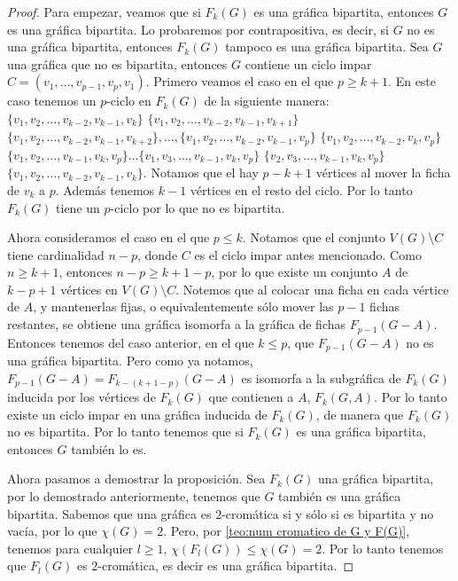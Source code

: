 \begin{proof}
    Para empezar, veamos que si $F_k(G)$ es una gr\'afica bipartita, entonces
    $G$ es una gr\'afica bipartita. Lo probaremos por contrapositiva, es decir,
    si $G$ no es una gr\'afica bipartita, entonces $F_k(G)$ tampoco es una
    gr\'afica bipartita. Sea $G$ una gr\'afica que no es bipartita, entonces $G$
    contiene un ciclo impar $C=(v_1, \dots, v_{p-1}, v_p, v_1)$. Primero veamos
    el caso en el que $p \geq k+1$. En este caso tenemos un $p$-ciclo en
    $F_k(G)$ de la siguiente manera: $\{v_1, v_2, \dots, v_{k-2}, v_{k-1},
    v_k\}$ $\{v_1, v_2, \dots, v_{k-2}, v_{k-1}, v_{k+1}\}$ $\{v_1, v_2, \dots,
    v_{k-2}, v_{k-1}, v_{k+2}\}, \dots, \{v_1, v_2, \dots, v_{k-2}, v_{k-1},
    v_p\}$ $\{v_1, v_2, \dots, v_{k-2}, v_k, v_p\}$ $\{v_1, v_2, \dots, v_{k-1},
    v_k, v_p\} \dots \{v_1, v_3, \dots, v_{k-1}, v_k, v_p\}$ $\{v_2, v_3,
    \dots, v_{k-1}, v_k, v_p\}$ $\{v_1, v_2, \dots, v_{k-2}, v_{k-1}, v_k\}$.
    Notamos que el hay $p-k+1$ v\'ertices al mover la ficha de $v_k$ a $p$.
    Adem\'as tenemos $k-1$ v\'ertices en el resto del ciclo. Por lo tanto
    $F_k(G)$ tiene un $p$-ciclo por lo que no es bipartita.
    
    Ahora consideramos el caso en el que $p \leq k$. Notamos que el conjunto
    $V(G)\setminus C$ tiene cardinalidad $n-p$, donde $C$ es el ciclo impar
    antes mencionado. Como $n \geq k+1$, entonces $n-p \geq k+1-p$, por lo que
    existe un conjunto $A$ de $k-p+1$ v\'ertices en $V(G)\setminus C$. Notemos
    que al colocar una ficha en cada v\'ertice de $A$, y mantenerlas fijas, o
    equivalentemente s\'olo mover las $p-1$ fichas restantes, se obtiene una
    gr\'afica isomorfa a la gr\'afica de fichas $F_{p-1}(G-A)$. Entonces tenemos
    del caso anterior, en el que $k \leq p$, que $F_{p-1}(G-A)$ no es una
    gr\'afica bipartita. Pero como ya notamos, $F_{p-1}(G-A) = F_{k-(k+1-p)}
    (G-A)$ es isomorfa a la subgr\'afica de $F_k(G)$ inducida por los v\'ertices
    de $F_k(G)$ que contienen a $A$, $F_k(G,A)$. Por lo tanto existe un ciclo
    impar en una gr\'afica inducida de $F_k(G)$, de manera que $F_k(G)$ no es
    bipartita. Por lo tanto tenemos que si $F_k(G)$ es una gr\'afica bipartita,
    entonces $G$ tambi\'en lo es.

    Ahora pasamos a demostrar la proposici\'on. Sea $F_k(G)$ una gr\'afica
    bipartita, por lo demostrado anteriormente, tenemos que $G$ tambi\'en es una
    gr\'afica bipartita. Sabemos que una gr\'afica es $2$-crom\'atica si y
    s\'olo si es bipartita y no vac\'ia, por lo que $\chi(G)=2$. Pero, por
    \cref{teo:num cromatico de G y F(G)}, tenemos para cualquier $l\geq 1$,
    $\chi (F_l(G)) \le \chi (G) = 2$. Por lo tanto tenemos que $F_l(G)$ es
    $2$-crom\'atica, es decir es una gr\'afica bipartita.
\end{proof}


